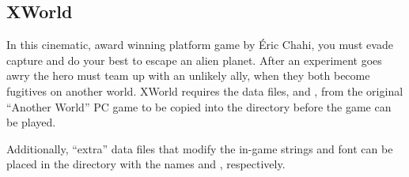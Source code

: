 \subsection{XWorld}

In this cinematic, award winning platform game by Éric Chahi, you must evade capture
and do your best to escape an alien planet.  After an experiment goes awry the hero
must team up with an unlikely ally, when they both become fugitives on another world.
XWorld requires the data files,  and , from the original ``Another World''
PC game to be copied into the  directory before the game can be played.

Additionally, ``extra'' data files that modify the in-game strings and font can be placed in the  directory with the names  and , respectively.

